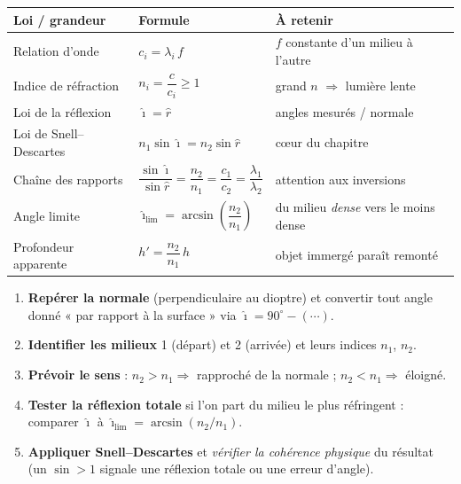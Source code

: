 \documentclass[11pt,a4paper]{article}
\newcommand{\angi}{\hat{\imath}}     %
\newcommand{\angr}{\hat{r}}          %
\begin{document}
\begin{center}
\renewcommand{\arraystretch}{1.5}
\begin{tabular}{>{\raggedright\arraybackslash}p{4.6cm} >{\centering\arraybackslash}p{5.0cm} >{\raggedright\arraybackslash}p{4.6cm}}
\rowcolor{primary!18}
\textbf{Loi / grandeur} & \textbf{Formule} & \textbf{À retenir} \\
\midrule
Relation d'onde & $c_i = \lambda_i\,f$ & $f$ constante d'un milieu à l'autre \\
Indice de réfraction & $n_i = \dfrac{c}{c_i} \ge 1$ & grand $n$ $\Rightarrow$ lumière lente \\
Loi de la réflexion & $\angi = \angr$ & angles mesurés / normale \\
Loi de Snell–Descartes & $n_1\sin\angi = n_2\sin\angr$ & cœur du chapitre \\
Chaîne des rapports & $\dfrac{\sin\angi}{\sin\angr}=\dfrac{n_2}{n_1}=\dfrac{c_1}{c_2}=\dfrac{\lambda_1}{\lambda_2}$ & attention aux inversions \\
Angle limite & $\angi_{\text{lim}}=\arcsin\!\left(\dfrac{n_2}{n_1}\right)$ & du milieu \emph{dense} vers le moins dense \\
Profondeur apparente & $h' = \dfrac{n_2}{n_1}\,h$ & objet immergé paraît remonté \\
\bottomrule
\end{tabular}
\end{center}

\begin{methode}
\begin{enumerate}[leftmargin=1.8em,topsep=2pt,itemsep=1pt]
  \item \textbf{Repérer la normale} (perpendiculaire au dioptre) et convertir tout angle donné
        « par rapport à la surface » via $\angi = 90^\circ - (\cdots)$.
  \item \textbf{Identifier les milieux} 1 (départ) et 2 (arrivée) et leurs indices $n_1$, $n_2$.
  \item \textbf{Prévoir le sens} : $n_2>n_1 \Rightarrow$ rapproché de la normale ; $n_2<n_1 \Rightarrow$ éloigné.
  \item \textbf{Tester la réflexion totale} si l'on part du milieu le plus réfringent :
        comparer $\angi$ à $\angi_{\text{lim}} = \arcsin(n_2/n_1)$.
  \item \textbf{Appliquer Snell–Descartes} et \emph{vérifier la cohérence physique} du résultat
        (un $\sin > 1$ signale une réflexion totale ou une erreur d'angle).
\end{enumerate}
\end{methode}
\end{document}
